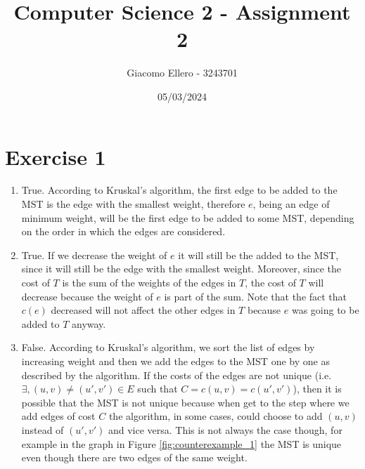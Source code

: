 \documentclass[10pt]{article}
\title{Computer Science 2 - Assignment 2}
\author{Giacomo Ellero - 3243701}
\date{05/03/2024}
\begin{document}
\maketitle

\section*{Exercise 1}

\begin{enumerate}
    \item True. According to Kruskal's algorithm, the first edge to be added to the MST is the edge with the smallest weight, therefore $e$, being an edge of minimum weight, will be the first edge to be added to some MST, depending on the order in which the edges are considered.
    \item True. If we decrease the weight of $e$ it will still be the added to the MST, since it will still be the edge with the smallest weight. Moreover, since the cost of $T$ is the sum of the weights of the edges in $T$, the cost of $T$ will decrease because the weight of $e$ is part of the sum. Note that the fact that $c(e)$ decreased will not affect the other edges in $T$ because $e$ was going to be added to $T$ anyway.
    \item False. According to Kruskal's algorithm, we sort the list of edges by increasing weight and then we add the edges to the MST one by one as described by the algorithm. If the costs of the edges are not unique (i.e. $\exists, (u, v) \neq (u', v') \in E$ such that $C = c(u, v) = c(u', v')$), then it is possible that the MST is not unique because when get to the step where we add edges of cost $C$ the algorithm, in some cases, could choose to add $(u, v)$ instead of $(u', v')$ and vice versa. This is not always the case though, for example in the graph in Figure \ref{fig:counterexample_1} the MST is unique even though there are two edges of the same weight.

          \begin{figure}[H]
              \centering

\end{figure}
\end{enumerate}
\end{document}
